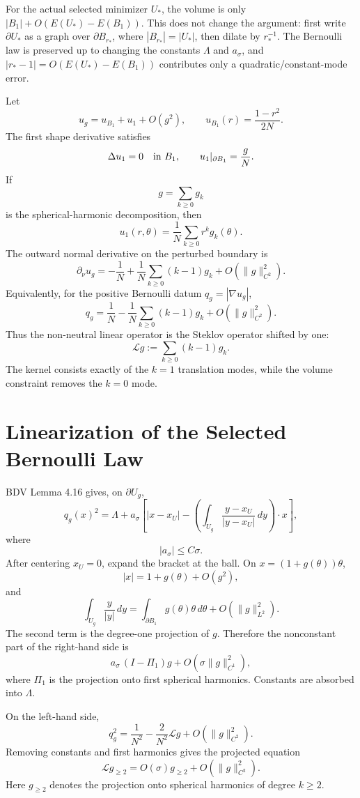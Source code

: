\documentclass[11pt]{article}
\begin{document}
For the actual selected minimizer \(U_*\), the volume is only
\(|B_1|+O(E(U_*)-E(B_1))\). This does not change the argument: first write
\(\partial U_*\) as a graph over \(\partial B_{r_*}\), where
\(|B_{r_*}|=|U_*|\), then dilate by \(r_*^{-1}\). The Bernoulli law is
preserved up to changing the constants \(\Lambda\) and \(a_\sigma\), and
\(|r_*-1|=O(E(U_*)-E(B_1))\) contributes only a quadratic/constant-mode error.

Let
\[
u_g=u_{B_1}+u_1+O(g^2),
\qquad
u_{B_1}(r)=\frac{1-r^2}{2N}.
\]
The first shape derivative satisfies
\[
\Delta u_1=0\quad\hbox{in }B_1,
\qquad
u_1|_{\partial B_1}=\frac{g}{N}.
\]
If
\[
g=\sum_{k\ge0}g_k
\]
is the spherical-harmonic decomposition, then
\[
u_1(r,\theta)=\frac1N\sum_{k\ge0} r^k g_k(\theta).
\]
The outward normal derivative on the perturbed boundary is
\[
\partial_\nu u_g
=
-\frac1N
+\frac1N\sum_{k\ge0}(k-1)g_k
+O(\|g\|_{C^2}^2).
\]
Equivalently, for the positive Bernoulli datum \(q_g=|\nabla u_g|\),
\[
q_g
=
\frac1N
-\frac1N\sum_{k\ge0}(k-1)g_k
+O(\|g\|_{C^2}^2).
\]
Thus the non-neutral linear operator is the Steklov operator shifted by one:
\[
\mathcal L g
:=\sum_{k\ge0}(k-1)g_k.
\]
The kernel consists exactly of the \(k=1\) translation modes, while the volume
constraint removes the \(k=0\) mode.

\section{Linearization of the Selected Bernoulli Law}

BDV Lemma 4.16 gives, on \(\partial U_g\),
\[
q_g(x)^2
=
\Lambda
+a_\sigma
\left[
|x-x_U|
-
\left(\int_{U_g}\frac{y-x_U}{|y-x_U|}\,dy\right)\cdot x
\right],
\]
where
\[
|a_\sigma|\le C\sigma.
\]
After centering \(x_U=0\), expand the bracket at the ball. On
\(x=(1+g(\theta))\theta\),
\[
|x|=1+g(\theta)+O(g^2),
\]
and
\[
\int_{U_g}\frac{y}{|y|}\,dy
=
\int_{\partial B_1}g(\theta)\theta\,d\theta
+O(\|g\|_{L^2}^2).
\]
The second term is the degree-one projection of \(g\). Therefore the
nonconstant part of the right-hand side is
\[
a_\sigma\,(I-\Pi_1)g+O(\sigma\|g\|_{C^1}^2),
\]
where \(\Pi_1\) is the projection onto first spherical harmonics. Constants are
absorbed into \(\Lambda\).

On the left-hand side,
\[
q_g^2
=
\frac1{N^2}
-\frac{2}{N^2}\mathcal L g
+O(\|g\|_{C^2}^2).
\]
Removing constants and first harmonics gives the projected equation
\[
\boxed{
\mathcal L g_{\ge2}
=
O(\sigma)g_{\ge2}
+O(\|g\|_{C^2}^2).
}
\]
Here \(g_{\ge2}\) denotes the projection onto spherical harmonics of degree
\(k\ge2\).
\end{document}
